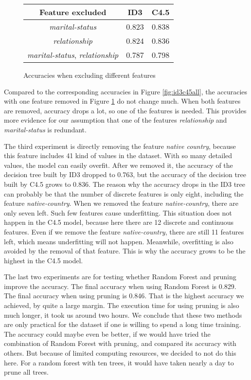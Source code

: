 \documentclass[a4paper]{article}
\begin{document}
\begin{figure}[h]
    \centering
        \begin{tabular}{c|c|c}
        \textbf{Feature excluded} & \textbf{ID3} & \textbf{C4.5} \\
        \hline
        \emph{marital-status} & 0.823 & 0.838 \\
        \emph{relationship} & 0.824 & 0.836 \\
        \emph{marital-status}, \emph{relationship} & 0.787 & 0.798
        \end{tabular}
    \caption{Accuracies when excluding different features}
    \label{fig:id3c45second}
 \end{figure}

Compared to the corresponding accuracies in Figure \ref{fig:id3c45all}, the accuracies with one feature removed in Figure \ref{fig:id3c45second} do not change much. When both features are removed, accuracy drops a lot, so one of the features is needed. This provides more evidence for our assumption that one of the features \emph{relationship} and \emph{marital-status} is redundant.

The third experiment is directly removing the feature \emph{native country}, because this feature includes 41 kind of values in the dataset. With so many detailed values, the model can easily overfit. After we removed it, the accuracy of the decision tree built by ID3 dropped to 0.763, but the accuracy of the decision tree built by C4.5 grows to 0.836. The reason why the accuracy drops in the ID3 tree can probably be that the number of discrete features is only eight, including the feature \emph{native-country}. When we removed the feature \emph{native-country}, there are only seven left. Such few features cause underfitting. This situation does not happen in the C4.5 model, because here there are 12 discrete and continuous features. Even if we remove the feature \emph{native-country}, there are still 11 features left, which means underfitting will not happen. Meanwhile, overfitting is also avoided by the removal of that feature. This is why the accuracy grows to be the highest in the C4.5 model.

The last two experiments are for testing whether Random Forest and pruning improve the accuracy. The final accuracy when using Random Forest is 0.829. The final accuracy when using pruning is 0.846. That is the highest accuracy we achieved, by quite a large margin. The execution time for using pruning is also much longer, it took us around two hours. We conclude that these two methods are only practical for the dataset if one is willing to spend a long time training. The accuracy could maybe even be better, if we would have tried the combination of Random Forest with pruning, and compared its accuracy with others. But because of limited computing resources, we decided to not do this here. For a random forest with ten trees, it would have taken nearly a day to prune all trees.
\end{document}
